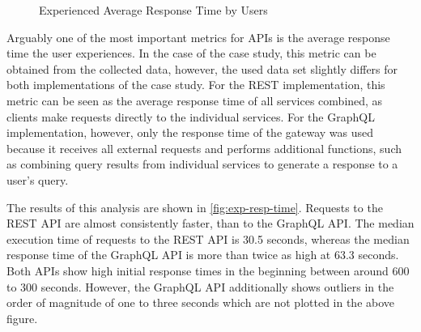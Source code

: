 \begin{figure}[!h]
    \centering
    \caption{Experienced Average Response Time by Users}\label{fig:exp-resp-time}    
\end{figure}

Arguably one of the most important metrics for \acp{API} is the average response time the user experiences.
In the case of the case study, this metric can be obtained from the collected data, however, the used data set slightly differs for both implementations of the case study.
For the \ac{REST} implementation, this metric can be seen as the average response time of all services combined, as clients make requests directly to the individual services.
For the GraphQL implementation, however, only the response time of the gateway was used because it receives all external requests and performs additional functions, such as combining query results from individual services to generate a response to a user's query.

The results of this analysis are shown in \autoref{fig:exp-resp-time}.
Requests to the \ac{REST} \ac{API} are almost consistently faster, than to the GraphQL \ac{API}.
The median execution time of requests to the \ac{REST} \ac{API} is 30.5 seconds, whereas the median response time of the GraphQL \ac{API} is more than twice as high at 63.3 seconds.
Both \acp{API} show high initial response times in the beginning between around 600 to 300 seconds.
However, the GraphQL \ac{API} additionally shows outliers in the order of magnitude of one to three seconds which are not plotted in the above figure.

